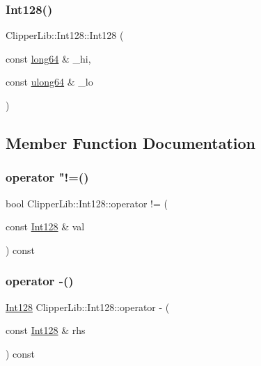 \subsubsection{\texorpdfstring{Int128()}{Int128()}\hspace{0.1cm}{\footnotesize\ttfamily [3/3]}}
{\footnotesize\ttfamily Clipper\+Lib\+::\+Int128\+::\+Int128 (\begin{DoxyParamCaption}\item[{const \mbox{\hyperlink{namespace_clipper_lib_a7fd564bf34d174b6c96e07d01e5e7a0a}{long64}} \&}]{\+\_\+hi,  }\item[{const \mbox{\hyperlink{namespace_clipper_lib_a031fec5e97eb7e08708f1cafa53a232d}{ulong64}} \&}]{\+\_\+lo }\end{DoxyParamCaption})\hspace{0.3cm}{\ttfamily [inline]}}



\subsection{Member Function Documentation}
\mbox{\label{class_clipper_lib_1_1_int128_a2299394b0fe19c77fe9f14fc8683a0a6}} 
\subsubsection{\texorpdfstring{operator "!=()}{operator !=()}}
{\footnotesize\ttfamily bool Clipper\+Lib\+::\+Int128\+::operator != (\begin{DoxyParamCaption}\item[{const \mbox{\hyperlink{class_clipper_lib_1_1_int128}{Int128}} \&}]{val }\end{DoxyParamCaption}) const\hspace{0.3cm}{\ttfamily [inline]}}

\mbox{\label{class_clipper_lib_1_1_int128_ae983529021a512ecbd345148936a2d02}} 
\subsubsection{\texorpdfstring{operator -\/()}{operator -()}}
{\footnotesize\ttfamily \mbox{\hyperlink{class_clipper_lib_1_1_int128}{Int128}} Clipper\+Lib\+::\+Int128\+::operator -\/ (\begin{DoxyParamCaption}\item[{const \mbox{\hyperlink{class_clipper_lib_1_1_int128}{Int128}} \&}]{rhs }\end{DoxyParamCaption}) const\hspace{0.3cm}{\ttfamily [inline]}}

